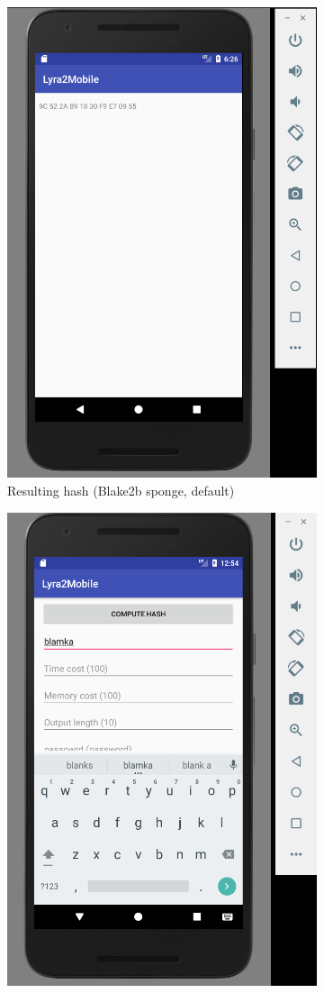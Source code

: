 \begin{figure}[H]
\begin{subfigure}{.5\textwidth}
  \includegraphics[width=.8\linewidth]{figures/lyra2-mobile-result-clean}
  \caption{Resulting hash (Blake2b sponge, default)}
  \label{fig:lyra2-mobile-result}
\end{subfigure}
\begin{subfigure}{.5\textwidth}
  \centering
  \includegraphics[width=.8\linewidth]{figures/lyra2-mobile-main-blamka-clean}

\end{subfigure}
\end{figure}
